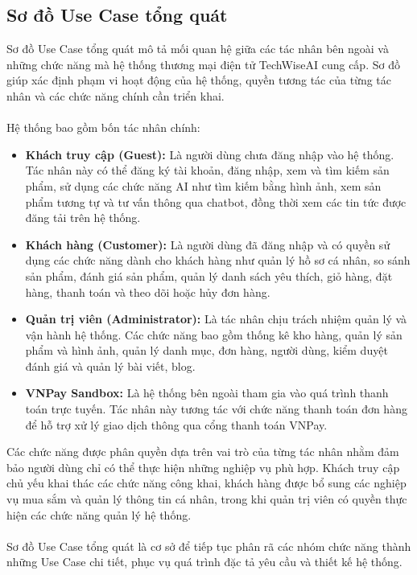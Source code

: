 \documentclass{report}
\begin{document}
\subsection{Sơ đồ Use Case tổng quát}
Sơ đồ Use Case tổng quát mô tả mối quan hệ giữa các tác nhân bên ngoài và những chức năng mà hệ thống thương mại điện tử TechWiseAI cung cấp. Sơ đồ giúp xác định phạm vi hoạt động của hệ thống, quyền tương tác của từng tác nhân và các chức năng chính cần triển khai.\\\\
Hệ thống bao gồm bốn tác nhân chính:

\begin{itemize}
    \item \textbf{Khách truy cập (Guest):} Là người dùng chưa đăng nhập vào hệ thống. Tác nhân này có thể đăng ký tài khoản, đăng nhập, xem và tìm kiếm sản phẩm, sử dụng các chức năng AI như tìm kiếm bằng hình ảnh, xem sản phẩm tương tự và tư vấn thông qua chatbot, đồng thời xem các tin tức được đăng tải trên hệ thống.
    \item \textbf{Khách hàng (Customer):} Là người dùng đã đăng nhập và có quyền sử dụng các chức năng dành cho khách hàng như quản lý hồ sơ cá nhân, so sánh sản phẩm, đánh giá sản phẩm, quản lý danh sách yêu thích, giỏ hàng, đặt hàng, thanh toán và theo dõi hoặc hủy đơn hàng.
    \item \textbf{Quản trị viên (Administrator):} Là tác nhân chịu trách nhiệm quản lý và vận hành hệ thống. Các chức năng bao gồm thống kê kho hàng, quản lý sản phẩm và hình ảnh, quản lý danh mục, đơn hàng, người dùng, kiểm duyệt đánh giá và quản lý bài viết, blog.
    \item \textbf{VNPay Sandbox:} Là hệ thống bên ngoài tham gia vào quá trình thanh toán trực tuyến. Tác nhân này tương tác với chức năng thanh toán đơn hàng để hỗ trợ xử lý giao dịch thông qua cổng thanh toán VNPay.
\end{itemize}

Các chức năng được phân quyền dựa trên vai trò của từng tác nhân nhằm đảm bảo người dùng chỉ có thể thực hiện những nghiệp vụ phù hợp. Khách truy cập chủ yếu khai thác các chức năng công khai, khách hàng được bổ sung các nghiệp vụ mua sắm và quản lý thông tin cá nhân, trong khi quản trị viên có quyền thực hiện các chức năng quản lý hệ thống.\\\\
Sơ đồ Use Case tổng quát là cơ sở để tiếp tục phân rã các nhóm chức năng thành những Use Case chi tiết, phục vụ quá trình đặc tả yêu cầu và thiết kế hệ thống.
    
\end{document}
